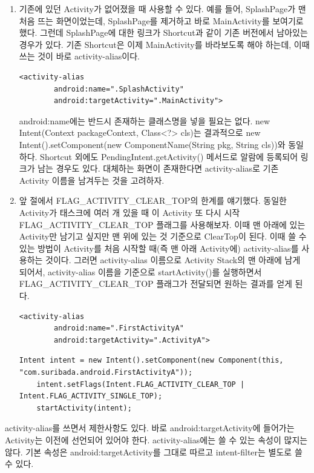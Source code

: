 \begin{enumerate}
\item 기존에 있던 Activity가 없어졌을 때 사용할 수 있다.
예를 들어, SplashPage가 맨 처음 뜨는 화면이었는데, SplashPage를 제거하고 바로 MainActivity를 보여기로 했다.
그런데 SplashPage에 대한 링크가 Shortcut과 같이 기존 버전에서 남아있는 경우가 있다.
기존 Shortcut은 이제 MainActivity를 바라보도록 해야 하는데, 이때 쓰는 것이 바로 activity-alias이다.
\begin{lstlisting}[frame=single]
	<activity-alias
    	android:name=".SplashActivity"
        android:targetActivity=".MainActivity">
\end{lstlisting}
android:name에는 반드시 존재하는 클래스명을 넣을 필요는 없다. new Intent(Context packageContext, Class<?> cls)는 결과적으로 new Intent().setComponent(new ComponentName(String pkg, String cls))와 동일하다. 
Shortcut 외에도 PendingIntent.getActivity() 메서드로 알람에 등록되어 링크가 남는 경우도 있다. 대체하는 화면이 존재한다면 activity-alias로 기존 Activity 이름을 남겨두는 것을 고려하자.
\item 앞 절에서 FLAG\_ACTIVITY\_CLEAR\_TOP의 한계를 얘기했다. 동일한 Activity가 태스크에 여러 개 있을 때 이 Activity 또 다시 시작FLAG\_ACTIVITY\_CLEAR\_TOP 플래그를 사용해보자. 이때 맨 아래에 있는 Activity만 남기고 싶지만 맨 위에 있는 것 기준으로 ClearTop이 된다. 이때 쓸 수 있는 방법이 Activity를 처음 시작할 때(즉 맨 아래 Activity에) activity-alias를 사용하는 것이다. 그러면 activity-alias 이름으로  Activity Stack의 맨 아래에 남게 되어서, activity-alias 이름을 기준으로 startActivity()를 실행하면서 FLAG\_ACTIVITY\_CLEAR\_TOP 플래그가 전달되면 원하는 결과를 얻게 된다.
\begin{lstlisting}[frame=single]
	<activity-alias
    	android:name=".FirstActivityA"
        android:targetActivity=".ActivityA">
\end{lstlisting}
\begin{lstlisting}[frame=single]
	Intent intent = new Intent().setComponent(new Component(this, "com.suribada.android.FirstActivityA"));
	intent.setFlags(Intent.FLAG_ACTIVITY_CLEAR_TOP | Intent.FLAG_ACTIVITY_SINGLE_TOP);
	startActivity(intent);
\end{lstlisting}
\end{enumerate} 

activity-alias를 쓰면서 제한사항도 있다.
바로 android:targetActivity에 들어가는 Activity는 이전에 선언되어 있어야 한다. 
activity-alias에는 쓸 수 있는 속성이 많지는 않다. 기본 속성은 android:targetActivity를 그대로 따르고 intent-filter는 별도로 쓸 수 있다.
